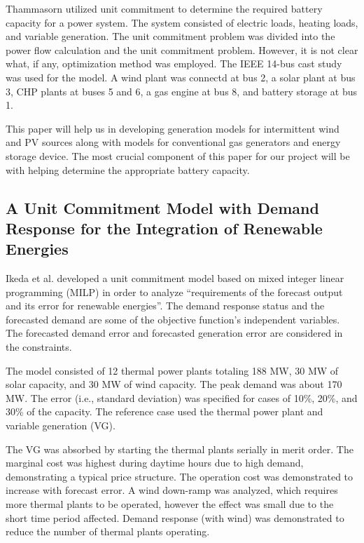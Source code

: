 \documentclass[a4paper]{article}
\begin{document}
Thammasorn\cite{thammasorn2013generation} utilized unit commitment to determine the required battery capacity for a power system. The system consisted of electric loads, heating loads, and variable generation. The unit commitment problem was divided into the power flow calculation and the unit commitment problem. However, it is not clear what, if any, optimization method was employed. The IEEE 14-bus cast study was used for the model. A wind plant was connectd at bus 2, a solar plant at bus 3, CHP plants at buses 5 and 6, a gas engine at bus 8, and battery storage at bus 1. 

This paper will help us in developing generation models for intermittent wind and PV sources along with models for conventional gas generators and energy storage device. The most crucial component of this paper for our project will be with helping determine the appropriate battery capacity.

\subsection{A Unit Commitment Model with Demand Response for the Integration of Renewable Energies}

Ikeda et al.\cite{ikeda2012unit} developed a unit commitment model based on mixed integer linear programming (MILP) in order to analyze “requirements of the forecast output and its error for renewable energies”. The demand response status and the forecasted demand are some of the objective function’s independent variables. The forecasted demand error and forecasted generation error are considered in the constraints.

The model consisted of 12 thermal power plants totaling 188 MW, 30 MW of solar capacity, and 30 MW of wind capacity. The peak demand was about 170 MW. The error (i.e., standard deviation) was specified for cases of 10\%, 20\%, and 30\% of the capacity. The reference case used the thermal power plant and variable generation (VG).

The VG was absorbed by starting the thermal plants serially in merit order. The marginal cost was highest during daytime hours due to high demand, demonstrating a typical price structure. The operation cost was demonstrated to increase with forecast error. A wind down-ramp was analyzed, which requires more thermal plants to be operated, however the effect was small due to the short time period affected. Demand response (with wind) was demonstrated to reduce the number of thermal plants operating.
\end{document}
